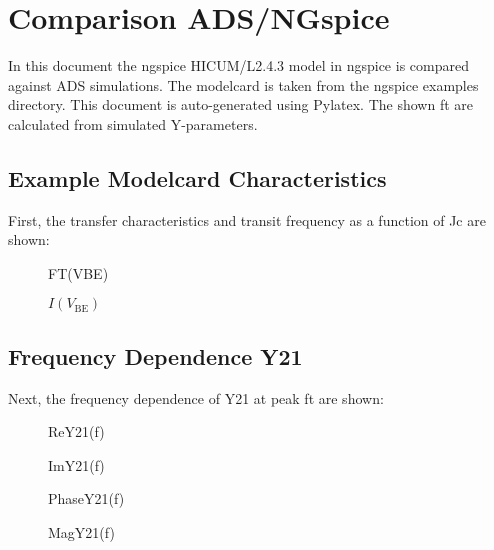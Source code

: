 \documentclass{article}%
\begin{document}
%
\normalsize%
\section{Comparison ADS/NGspice}%
\label{sec:ComparisonADS/NGspice}%
In this document the ngspice HICUM/L2.4.3 model in ngspice is compared against ADS simulations.%
The modelcard is taken from the ngspice examples directory. %
This document is auto-generated using Pylatex. The shown ft are calculated from simulated Y-parameters. %
\subsection{Example Modelcard Characteristics}%
\label{subsec:ExampleModelcardCharacteristics}%
First, the transfer characteristics and transit frequency as a function of Jc are shown: %


\begin{figure}[h!]%
%
\caption{FT(VBE)}%
\label{FT(VBE)}%
\end{figure}

%


\begin{figure}[h!]%
%
\caption{$I(V_{\mathrm{BE}})$}%
\label{I(V_BE)}%
\end{figure}

%
\newpage%
\subsection{Frequency Dependence Y21}%
\label{subsec:FrequencyDependenceY21}%
Next, the frequency dependence of Y21 at peak ft are shown: %


\begin{figure}[h!]%
%
\caption{ReY21(f)}%
\label{ReY21(f)}%
\end{figure}

%


\begin{figure}[h!]%
%
\caption{ImY21(f)}%
\label{ImY21(f)}%
\end{figure}

%


\begin{figure}[h!]%
%
\caption{PhaseY21(f)}%
\label{PhaseY21(f)}%
\end{figure}

%


\begin{figure}[h!]%
%
\caption{MagY21(f)}%
\label{MagY21(f)}%
\end{figure}

%
\end{document}
